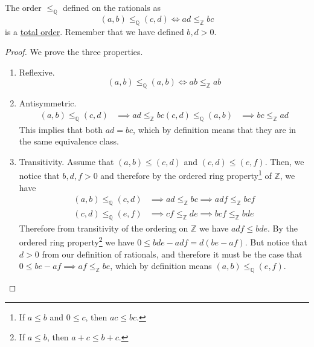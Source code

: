  \begin{theorem}
    \label{thm:order-on-rationals}
    The order $\leq_{\mathbb{Q}}$ defined on the rationals as 
    \begin{equation}
      (a, b) \leq_{\mathbb{Q}} (c, d) \iff ad \leq_{\mathbb{Z}} bc
    \end{equation}
    is a \hyperref[def:total-order]{total order}. Remember that we have defined $b, d > 0$. 
  \end{theorem}
  \begin{proof}
    We prove the three properties. 
    \begin{enumerate}
      \item Reflexive. 
      \begin{equation}
        (a, b) \leq_{\mathbb{Q}} (a, b) \iff ab \leq_{\mathbb{Z}} ab
      \end{equation} 

      \item Antisymmetric. 
      \begin{align}
        (a, b) \leq_{\mathbb{Q}} (c, d) & \implies ad \leq_{\mathbb{Z}} bc
        (c, d) \leq_{\mathbb{Q}} (a, b) & \implies bc \leq_{\mathbb{Z}} ad
      \end{align} 
      This implies that both $ad = bc$, which by definition means that they are in the same equivalence class. 

      \item Transitivity. Assume that $(a, b) \leq (c, d)$ and $(c, d) \leq (e, f)$. Then, we notice that $b, d, f > 0$ and therefore by the ordered ring property\footnote{If $a \leq b$ and $0 \leq c$, then $ac \leq bc$.} of $\mathbb{Z}$, we have 
      \begin{align}
        (a, b) \leq_{\mathbb{Q}} (c, d) & \implies ad \leq_{\mathbb{Z}} bc \implies adf \leq_{\mathbb{Z}} bcf \\ 
        (c, d) \leq_{\mathbb{Q}} (e, f) & \implies cf \leq_{\mathbb{Z}} de \implies bcf \leq_{\mathbb{Z}} bde
      \end{align}
      Therefore from transitivity of the ordering on $\mathbb{Z}$ we have $adf \leq bde$. By the ordered ring property\footnote{If $a \leq b$, then $a + c \leq b + c$.}  we have $0 \leq bde - adf = d(be - af)$. But notice that $d > 0$ from our definition of rationals, and therefore it must be the case that $0 \leq be - af \implies af \leq_{\mathbb{Z}} be$, which by definition means $(a, b) \leq_{\mathbb{Q}} (e, f)$. 
    \end{enumerate}
  \end{proof} 

